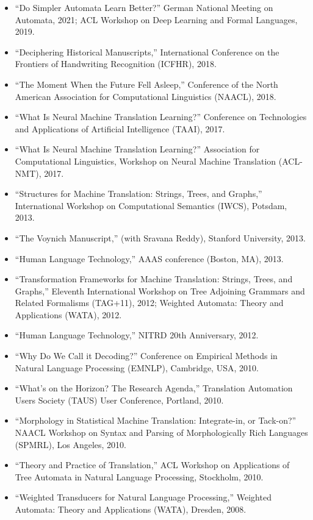\pagebreak
{} 

\begin{itemize}
\item ``Do Simpler Automata Learn Better?'' German National Meeting on Automata, 2021; ACL Workshop on Deep Learning and Formal Languages, 2019.
\item ``Deciphering Historical Manuscripts,'' International Conference on the Frontiers of Handwriting Recognition (ICFHR), 2018.
\item ``The Moment When the Future Fell Asleep,'' Conference of the North American Association for Computational Linguistics (NAACL), 2018.
\item ``What Is Neural Machine Translation Learning?'' Conference on Technologies and Applications of Artificial Intelligence (TAAI), 2017.
\item ``What Is Neural Machine Translation Learning?'' Association for Computational Linguistics, Workshop on Neural Machine Translation (ACL-NMT), 2017.
\item ``Structures for Machine Translation: Strings, Trees, and Graphs,'' International Workshop on Computational Semantics (IWCS), Potsdam, 2013.
\item ``The Voynich Manuscript,'' (with Sravana Reddy), Stanford University, 2013.
\item ``Human Language Technology,'' AAAS conference (Boston, MA), 2013.
\item ``Transformation Frameworks for Machine Translation: Strings, Trees, and Graphs,'' Eleventh International Workshop on Tree Adjoining Grammars and Related Formalisms (TAG+11), 2012; Weighted Automata: Theory and Applications (WATA), 2012.
\item ``Human Language Technology,'' NITRD 20th Anniversary, 2012.
\item ``Why Do We Call it Decoding?'' Conference on Empirical Methods in Natural Language Processing (EMNLP), Cambridge, USA, 2010.
\item ``What's on the Horizon?  The Research Agenda,'' Translation Automation Users Society (TAUS) User Conference, Portland, 2010.
\item ``Morphology in Statistical Machine Translation: Integrate-in, or Tack-on?'' NAACL Workshop on Syntax and Parsing of Morphologically Rich Languages (SPMRL), Los Angeles, 2010.
\item ``Theory and Practice of Translation,'' ACL Workshop on Applications of Tree Automata in Natural Language Processing, Stockholm, 2010.
\item ``Weighted Transducers for Natural Language Processing,'' Weighted Automata: Theory and Applications (WATA), Dresden, 2008.

\end{itemize}
